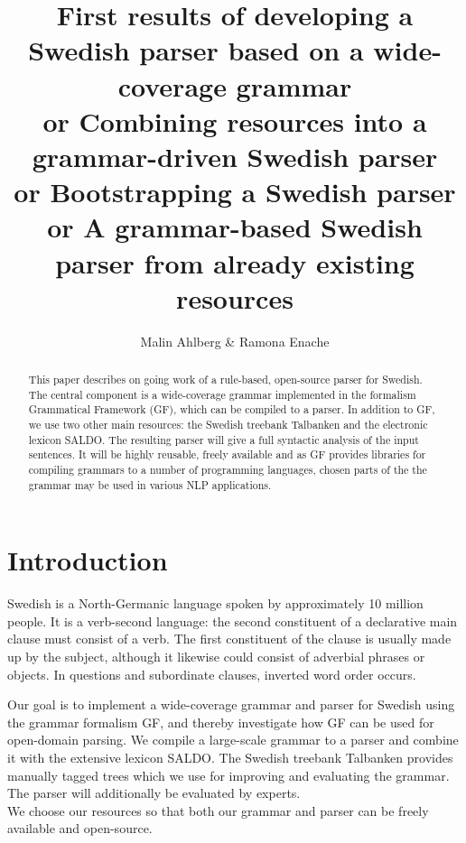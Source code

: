 \documentclass[submission]{eptcs} %
\title{First results of developing a Swedish parser based on a wide-coverage grammar\\
        or Combining resources into a grammar-driven Swedish parser \\
        or Bootstrapping a Swedish parser \\
        or A grammar-based Swedish parser from already existing resources}
\author{Malin Ahlberg \& Ramona Enache
\institute{Department of Computer Science \& Engineering, Gothenburg University, Sweden}
}
\begin{document}
\maketitle

\begin{abstract}
This paper describes on going work of a rule-based, open-source
parser for Swedish. The central component is a wide-coverage grammar
implemented in the formalism Grammatical Framework (GF), which
can be compiled to a %
parser.
In addition to GF, we use two other main resources: the Swedish
treebank Talbanken and the electronic lexicon SALDO.
The resulting parser will 
give a full syntactic analysis of the input sentences.
It will be highly reusable, freely available
and as GF provides libraries for compiling
grammars to a number of programming languages,
chosen parts of the the 
grammar may be used in various NLP applications. %

\end{abstract}

\section{Introduction}
Swedish is a North-Germanic language spoken by approximately 10 million people.
It is a verb-second language: the second constituent of a declarative main
clause must consist of a verb.
The first constituent of the clause is usually made up by the subject,
although it likewise could consist of adverbial phrases or objects.
In questions and subordinate clauses, inverted word order occurs.

Our goal is to implement a wide-coverage grammar and parser for Swedish
using the grammar formalism GF, and 
thereby investigate how GF can be used for open-domain parsing.
We compile a large-scale grammar to a parser
and combine it with the extensive lexicon SALDO. The Swedish treebank 
Talbanken provides manually tagged trees which we use for improving and evaluating
the grammar. The parser will additionally
be evaluated by experts. \\
We choose our resources so that both our grammar and parser can 
be freely available and open-source. 
\end{document}
